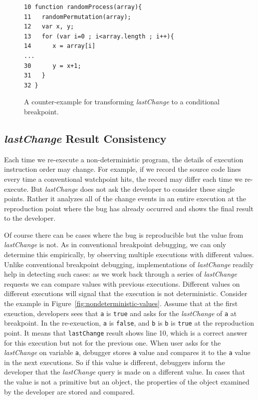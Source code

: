 \documentclass[runningheads,a4paper]{llncs}
\begin{document}
\begin{figure}[htp]
\begin{verbatim}
10 function randomProcess(array){
11   randomPermutation(array);
12   var x, y;
13   for (var i=0 ; i<array.length ; i++){
14      x = array[i]
...
30      y = x+1;
31   }
32 }
\end{verbatim}
\caption{A counter-example for transforming \textit{lastChange} to a conditional breakpoint.}
\label{fig:counter-example}
\end{figure}


\subsection{\textit{lastChange} Result Consistency}
Each time we re-execute a non-deterministic program, 
the details of execution instruction order may change. 
For example, if we record the source code lines every time
a conventional watchpoint hits, the record may differ each time we
re-execute. But \textit{lastChange} does not ask the developer to
consider these single points. Rather it analyzes all of the
change events in an entire execution at the reproduction point where the bug
has already occurred and shows the final result to the developer.

Of course there can be cases where the bug is reproducible but the
value from \textit{lastChange} is not. As in conventional breakpoint
debugging, we can only determine this empirically, by observing
multiple executions with different values. Unlike conventional
breakpoint debugging, implementations of \textit{lastChange} readily
help in detecting such cases: as we work back through a series of
\textit{lastChange} requests we can compare values with previous
executions. Different values on different executions will signal that
the execution is not deterministic. Consider the example in Figure~\ref{fig:nondeterministic-values}. 
Assume that at the first exeuction, developers sees that \texttt{a} is \texttt{true} and asks
for the \textit{lastChange} of \texttt{a} at breakpoint. In the re-exeuction, \texttt{a} is \texttt{false},
and \texttt{b} is \texttt{b} is \texttt{true} at the reproduction point. It means that \texttt{lastChange}
result shows line 10, which is a correct answer for this execution but not for the previous one.
When user asks for the \textit{lastChange} on variable \texttt{a}, debugger stores \texttt{a} value and compares
it to the \texttt{a} value in the next executions. So if this value is different, debuggers inform the developer
that the \textit{lastChange} query is made on a different value. In cases that the value is not a primitive but an object,
the properties of the object examined by the developer are stored and compared.
\end{document}
